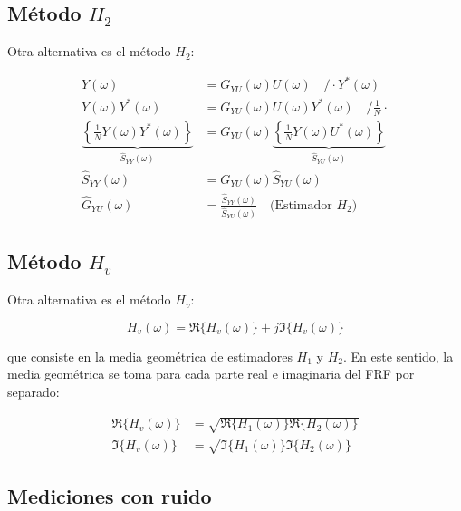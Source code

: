 \subsection{Método \texorpdfstring{$H_2$}{H2}}

Otra alternativa es el método $H_2$:

\begin{align*}
    Y(\omega) &= G_{YU}(\omega)U(\omega) \quad / \cdot Y^{*}(\omega)\\
    Y(\omega) Y^{*}(\omega) &= G_{YU}(\omega )U(\omega) Y^{*}(\omega) \quad / \frac{1}{N} \cdot \\
    \underbrace{\left\{\frac{1}{N}Y(\omega)Y^{*}(\omega)\right\}}_{\hat{S}_{YY}(\omega)} &= G_{YU}(\omega)  \underbrace{\left\{\frac{1}{N} Y(\omega)U^{*}(\omega) \right\}}_{\hat{S}_{YU}(\omega)} \\
    \hat{S}_{YY}(\omega) &= G_{YU}(\omega) \hat{S}_{YU}(\omega)\\
    \hat{G}_{YU}(\omega) &= \frac{\hat{S}_{YY}(\omega)}{\hat{S}_{YU}(\omega)} \quad \text{(Estimador $H_2$)}
\end{align*}

\subsection{Método \texorpdfstring{$H_v$}{Hv}}

Otra alternativa es el método $H_v$:

\begin{equation*}
    H_v(\omega) =\Re\{H_v(\omega)\} + j\Im\{H_v(\omega)\}
\end{equation*}

que consiste en la media geométrica de estimadores $H_1$ y $H_2$. En este sentido, la media geométrica se toma para cada parte real e imaginaria del FRF por separado:

\begin{align*}
    \Re\{H_v(\omega)\} & = \sqrt{\Re\{H_1(\omega)\} \Re\{H_2(\omega)\}} \\
    \Im\{H_v(\omega)\} & = \sqrt{\Im\{H_1(\omega)\} \Im\{H_2(\omega)\}}
\end{align*}

\subsection{Mediciones con ruido}


